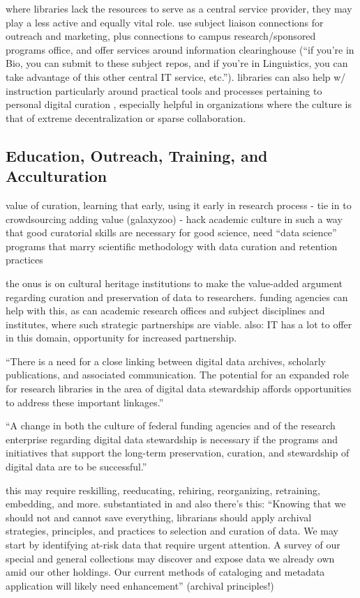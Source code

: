 \documentclass{acm_proc_article-sp}
\begin{document}
where libraries lack the resources to serve as a central service
provider, they may play a less active and equally vital role. use
subject liaison connections for outreach and marketing, plus
connections to campus research/sponsored programs office, and offer
services around information clearinghouse (``if you're in Bio, you can
submit to these subject repos, and if you're in Linguistics, you can
take advantage of this other central IT service, etc.''). libraries
can also help w/ instruction particularly around practical tools and
processes pertaining to personal digital curation
\cite{williams:lifecycle}, especially helpful in organizations where
the culture is that of extreme decentralization or sparse
collaboration.

\subsection{Education, Outreach, Training, and Acculturation}

value of curation, learning that early, using it early in research process -
tie in to crowdsourcing adding value (galaxyzoo) - hack academic culture in
such a way that good curatorial skills are necessary for good science, need
``data science'' programs that marry scientific methodology with data curation
and retention practices \cite{uw:datascience}

the onus is on cultural heritage institutions to make the value-added
argument regarding curation and preservation of data to researchers.
funding agencies can help with this, as can academic research offices
and subject disciplines and institutes, where such strategic
partnerships are viable.  also: IT has a lot to offer in this domain,
opportunity for increased partnership.

``There is a need for a close linking between digital data archives,
scholarly publications, and associated communication. The potential
for an expanded role for research libraries in the area of digital
data stewardship affords opportunities to address these important
linkages.'' \cite{arl:stewardship}

``A change in both the culture of federal funding agencies
and of the research enterprise regarding digital data stewardship is
necessary if the programs and initiatives that support the long-term
preservation, curation, and stewardship of digital data are to be
successful.'' \cite{arl:stewardship}

this may require reskilling, reeducating, rehiring, reorganizing,
retraining, embedding, and more. substantiated in \cite{jisc:deluge}
and also there's this: ``Knowing that we should not and cannot save
everything, librarians should apply archival strategies, principles,
and practices to selection and curation of data. We may start by
identifying at-risk data that require urgent attention. A survey of
our special and general collections may discover and expose data we
already own amid our other holdings. Our current methods of cataloging
and metadata application will likely need enhancement''
\cite{ogburn:imperative} (archival principles!)
\end{document}
